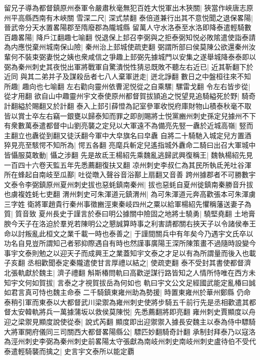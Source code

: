 留兄子導為都督鎮原州泰軍令嚴肅秋毫無犯百姓大悦軍出木狹關|{
	狹當作峽唐志原州平高縣西南有木峽關}
雪深二尺|{
	深式禁翻}
泰倍道兼行出其不意悦聞之退保畧陽|{
	晉武帝分天水置畧陽郡至隋廢郡為隴城縣}
留萬人守水洛泰至水洛即降泰遣輕騎數百趣畧陽|{
	降戶江翻趣七喻翻}
悦退保上邽召李弼與之拒泰弼知悦必敗隂遣使詣泰請為内應悦棄州城南保山險|{
	秦州治上邽城使疏吏翻}
弼謂所部曰侯莫陳公欲還秦州汝輩何不裝束弼妻悦之姨也衆咸信之爭趣上邽弼先據城門以安集之遂舉城降泰泰即以弼為秦州刺史其夜悦出軍將戰軍自驚潰悦性猜忌既敗不聽左右近已|{
	近其靳翻下於近同}
與其二弟并子及謀殺岳者七八人棄軍迸走|{
	迸北諍翻}
數日之中盤桓往來不知所趣|{
	趣向也七喻翻}
左右勸向靈州依曹泥悦從之自乘騾|{
	騾雷戈翻}
令左右皆步從|{
	從才用翻}
欲自山中趣靈州宇文泰使原州都督賀拔頴追之悦望見追騎縊死於野|{
	騎奇計翻縊於賜翻又於計翻}
泰入上邽引薛憕為記室參軍收悦府庫財物山積泰秋毫不取皆以賞士卒左右竊一銀甕以歸泰知而罪之即剖賜將士悦黨豳州刺史孫定兒據州不下有衆數萬泰遣都督中山劉亮襲之定兒以大軍遠不為備亮先竪一纛於近城高嶺|{
	竪而主翻立也纛從到翻又徒沃翻今軍中大皁旗名曰皁纛}
自將二十騎馳入城定兒方置酒猝見亮至駭愕不知所為|{
	愕五各翻}
亮麾兵斬定兒遙指城外纛命二騎曰出召大軍城中皆懾服莫敢動|{
	懾之涉翻}
先是故氐王楊紹先乘魏亂逃歸武興復稱王|{
	魏執楊紹先見一百四十六卷天監五年先悉薦翻復扶又翻}
凉州刺史李叔仁為其民所執氐羌吐谷渾所在蜂起自南岐至瓜鄯|{
	吐從暾入聲谷音浴鄯上扇翻又音善}
跨州據郡者不可勝數宇文泰令李弼鎮原州夏州刺史拔也惡蚝鎮南秦州|{
	拔也惡蚝自夏州徙鎮南秦勝音升拔也虜複姓蚝七吏翻}
渭州刺史可朱渾道元鎮渭州|{
	為可朱渾道元奔高歡張本可朱渾虜三字姓}
衛將軍趙貴行秦州事徵豳涇東秦岐四州之粟以給軍楊紹先懼稱藩送妻子為質|{
	質音致}
夏州長史于謹言於泰曰明公據關中險固之地將士驍勇|{
	驍堅堯翻}
土地膏腴今天子在洛迫於羣兇若陳明公之懇誠算時事之利害請都關右挾天子以令諸侯奉王命以討叛亂此桓文之業千載一時也泰善之|{
	于謹間關兵中有年矣今乃遇宇文氏卒以功名自見豈所謂知己者邪抑際遇自有時也然謹事廣陽王深所陳策畫不過隨時設變今事宇文泰則勉之以迎天子而成興王之業蓋知宇文泰之才足以有為所謂量而後入也載子亥翻}
丞相歡聞泰定秦隴遣使甘言厚禮以結之|{
	使疏吏翻}
泰不受封其書使都督濟北張軌獻於魏主|{
	濟子禮翻}
斛斯椿問軌曰高歡逆謀行路皆知之人情所恃唯在西方未知宇文何如賀拔|{
	言泰之才視賀拔岳為何如也}
軌曰宇文公文足經國武能定亂椿曰誠如君言真可恃也魏主命泰二千騎鎮東雍州助為勢援|{
	時置東雍州於華州鄭縣}
仍命泰稍引軍而東泰以大都督武川梁禦為雍州刺史使將步騎五千前行先是丞相歡遣其都督太安韓軌將兵一萬據蒲坂以救侯莫陳悦|{
	先悉薦翻將即亮翻}
雍州刺史賈顯度以舟迎之梁禦見顯度說使從泰|{
	說式芮翻}
顯度即出迎禦禦入據長安魏主以泰為侍中驃騎大將軍開府儀同三司關西大都督畧陽縣公|{
	驃匹妙翻騎奇計翻}
承制封拜泰乃以寇洛為涇州刺史李弼為秦州刺史前畧陽太守張獻為南岐州刺史南岐州刺史盧待伯不受代泰遣輕騎襲而擒之|{
	史言宇文泰所以能定覇}
